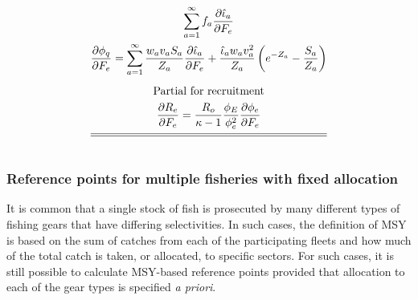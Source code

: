 \begin{multicols}{2}
\begin{tablehere}
\begin{gather}
            \sum_{a=1}^\infty f_a \frac{\partial \hat{\iota}_a}{\partial
            F_e}                                        \label{T3.4}\\
        \frac{\partial \phi_q}{\partial F_e}=
            \sum_{a=1}^\infty \frac{w_av_a S_a}{Z_a}
             \frac{\partial \hat{\iota}_a}{\partial F_e}
             +\frac{\hat{\iota}_a w_av_a^2}{Z_a}\left(e^{-Z_a}-\frac{S_a}{Z_a} \right)
                                                            \label{T3.5}\\[1ex]
        \mbox{Partial for recruitment} \nonumber\\
        \frac{\partial R_e}{\partial F_e}=\frac{R_o}{\kappa-1}
        \frac{\phi_E}{\phi_e^2} \frac{\partial \phi_e}{\partial
        F_e}                                                \label{T3.6}\\[1ex]
        \hline \hline \nonumber
    \end{gather}

    \normalEq
\end{tablehere}


\subsubsection{Reference points for multiple fisheries with fixed allocation} %
\label{ssub:reference_points_for_multiple_fisheries}
It is common that a single stock of fish is prosecuted by many different types of fishing gears that have differing selectivities.  In such cases, the definition of MSY is based on the sum of catches from each of the participating fleets and how much of the total catch is taken, or allocated, to specific sectors.  For such cases, it is still possible to calculate MSY-based reference points provided that allocation to each of the gear types is specified \emph{a priori}.


\end{multicols}
